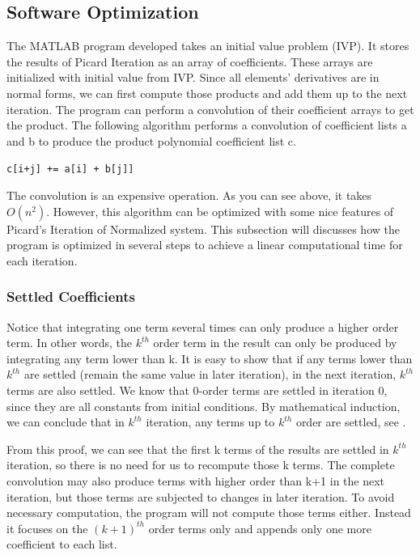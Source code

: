 \documentclass[12pt]{article}
\begin{document}
\subsection{Software Optimization}
The MATLAB program developed takes an initial value problem (IVP).
It stores the results of Picard Iteration as an array of coefficients. These arrays are initialized with initial value from IVP. Since all elements' derivatives are in normal forms, we can first compute those products and add them up to the next iteration. The program can perform a convolution of their coefficient arrays to get the product. The following algorithm performs a convolution of coefficient lists a and b to produce the product polynomial coefficient list c.

\begin{algorithmic}
      \State \texttt{c[i+j] += a[i] + b[j]]}
   \EndFor
\EndFor
\end{algorithmic}

The convolution is an expensive operation. As you can see above, it takes $O(n^2)$. However, this algorithm can be optimized with some nice features of Picard's Iteration of Normalized system. This subsection will discusses how the program is optimized in several steps to achieve a linear computational time for each iteration. 

\subsubsection{Settled Coefficients}

Notice that integrating one term several times can only produce a higher order term. In other words, the $k^{th}$ order term in the result can only be produced by integrating any term lower than k.
It is easy to show that if any terms lower than $k^{th}$ are settled (remain the same value in later iteration), in the next iteration, $k^{th}$ terms are also settled. We know that 0-order terms are settled in iteration 0, since they are all constants from initial conditions. By mathematical induction, we can conclude that in $k^{th}$ iteration, any terms up to $k^{th}$ order are settled, see \cite{SETTLE}. 

From this proof, we can see that the first k terms of the results are settled in $k^{th}$ iteration, so there is no need for us to recompute those k terms. The complete convolution may also produce terms with higher order than k+1 in the next iteration, but those terms are subjected to changes in later iteration. To avoid necessary computation, the program will not compute those terms either. Instead it focuses on the $(k+1)^{th}$ order terms only and appends only one more coefficient to each list.
\end{document}
